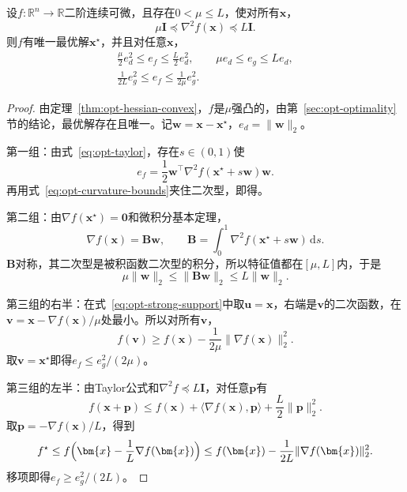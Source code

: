 \begin{theorem}[三种误差的换算]
\label{thm:opt-error-conversions}
设$f:\mathbb{R}^n\to\mathbb{R}$二阶连续可微，且存在$0<\mu\leq L$，使对所有$\bm{x}$，
\begin{equation}
 \mu\bm{I}\preceq\nabla^2f(\bm{x})\preceq L\bm{I}.
 \label{eq:opt-curvature-bounds}
\end{equation}
则$f$有唯一最优解$\bm{x}^\star$，并且对任意$\bm{x}$，
\begin{equation}
 \begin{gathered}
 \frac{\mu}{2}e_d^2\leq e_f\leq\frac{L}{2}e_d^2,\qquad
 \mu e_d\leq e_g\leq Le_d,\\
 \frac{1}{2L}e_g^2\leq e_f\leq\frac{1}{2\mu}e_g^2.
 \end{gathered}
 \label{eq:opt-error-conversions}
\end{equation}
\end{theorem}

\begin{proof}
由定理~\ref{thm:opt-hessian-convex}，$f$是$\mu$强凸的，由第~\ref{sec:opt-optimality}节的结论，最优解存在且唯一。记$\bm{w}=\bm{x}-\bm{x}^\star$，$e_d=\lVert\bm{w}\rVert_2$。

第一组：由式~\eqref{eq:opt-taylor}，存在$s\in(0,1)$使
\[
 e_f=\frac12\bm{w}^\top\nabla^2f(\bm{x}^\star+s\bm{w})\bm{w}.
\]
再用式~\eqref{eq:opt-curvature-bounds}夹住二次型，即得。

第二组：由$\nabla f(\bm{x}^\star)=\bm{0}$和微积分基本定理，
\[
 \nabla f(\bm{x})=\bm{B}\bm{w},\qquad\bm{B}=\int_0^1\nabla^2f(\bm{x}^\star+s\bm{w})\,\mathrm{d}s.
\]
$\bm{B}$对称，其二次型是被积函数二次型的积分，所以特征值都在$[\mu,L]$内，于是
\[
 \mu\lVert\bm{w}\rVert_2\leq\lVert\bm{B}\bm{w}\rVert_2\leq L\lVert\bm{w}\rVert_2.
\]

第三组的右半：在式~\eqref{eq:opt-strong-support}中取$\bm{u}=\bm{x}$，右端是$\bm{v}$的二次函数，在$\bm{v}=\bm{x}-\nabla f(\bm{x})/\mu$处最小。所以对所有$\bm{v}$，
\[
 f(\bm{v})\geq f(\bm{x})-\frac{1}{2\mu}\lVert\nabla f(\bm{x})\rVert_2^2.
\]
取$\bm{v}=\bm{x}^\star$即得$e_f\leq e_g^2/(2\mu)$。

第三组的左半：由Taylor公式和$\nabla^2f\preceq L\bm{I}$，对任意$\bm{p}$有
\[
 f(\bm{x}+\bm{p})\leq f(\bm{x})+\langle\nabla f(\bm{x}),\bm{p}\rangle+\frac{L}{2}\lVert\bm{p}\rVert_2^2.
\]
取$\bm{p}=-\nabla f(\bm{x})/L$，得到
\[
 f^\star\leq f\Bigl(\bm{x}-\frac{1}{L}\nabla f(\bm{x})\Bigr)\leq f(\bm{x})-\frac{1}{2L}\lVert\nabla f(\bm{x})\rVert_2^2.
\]
移项即得$e_f\geq e_g^2/(2L)$。
\end{proof}

